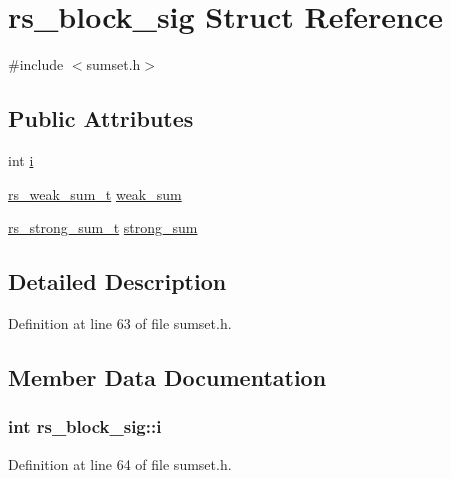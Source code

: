 \hypertarget{structrs__block__sig}{}\section{rs\+\_\+block\+\_\+sig Struct Reference}
\label{structrs__block__sig}


{\ttfamily \#include $<$sumset.\+h$>$}

\subsection*{Public Attributes}
\begin{DoxyCompactItemize}
\item 
int \hyperlink{structrs__block__sig_a4c5d45f576d9eb932d4339f7e2583697}{i}
\item 
\hyperlink{librsync_8h_a47fc8f5420a15ce91c13457d1522ad3c}{rs\+\_\+weak\+\_\+sum\+\_\+t} \hyperlink{structrs__block__sig_a7674e2cd7ea31db3347e6465dbcb35ce}{weak\+\_\+sum}
\item 
\hyperlink{librsync_8h_a4d9d32def7f72f51a4702a7d2eb30118}{rs\+\_\+strong\+\_\+sum\+\_\+t} \hyperlink{structrs__block__sig_a4728e761088b574b4803737ccd7cff7f}{strong\+\_\+sum}
\end{DoxyCompactItemize}


\subsection{Detailed Description}


Definition at line 63 of file sumset.\+h.



\subsection{Member Data Documentation}
\hypertarget{structrs__block__sig_a4c5d45f576d9eb932d4339f7e2583697}{}
\subsubsection[{i}]{\setlength{\rightskip}{0pt plus 5cm}int rs\+\_\+block\+\_\+sig\+::i}\label{structrs__block__sig_a4c5d45f576d9eb932d4339f7e2583697}


Definition at line 64 of file sumset.\+h.

\hypertarget{structrs__block__sig_a4728e761088b574b4803737ccd7cff7f}{}
